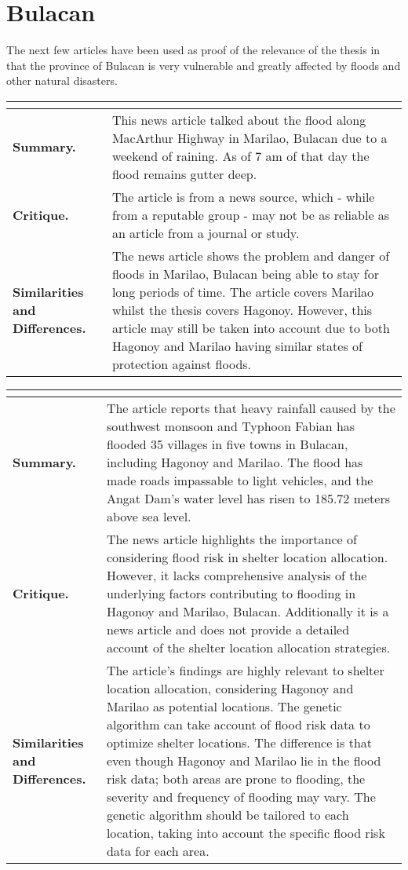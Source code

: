 \section{Bulacan}

The next few articles have been used as proof of the relevance of the thesis in that the province of Bulacan is very vulnerable and greatly affected by floods and other natural disasters.

\begin{longtable}{|L{.2\linewidth}|L{.74\linewidth}|}
	\hline
	\\ \hline
	\textbf{Summary.} & This news article talked about the flood along MacArthur Highway in Marilao, Bulacan due to a weekend of raining. As of 7 am of that day the flood remains gutter deep.\\ \hline
	\textbf{Critique.} & The article is from a news source, which - while from a reputable group - may not be as reliable as an article from a journal or study.\\ \hline
	\textbf{Similarities and Differences.} & The news article shows the problem and danger of floods in Marilao, Bulacan being able to stay for long periods of time. The article covers Marilao whilst the thesis covers Hagonoy. However, this article may still be taken into account due to both Hagonoy and Marilao having similar states of protection against floods. \\ \hline
\end{longtable}

\begin{longtable}{|L{.2\linewidth}|L{.74\linewidth}|}
	\hline
	\\ \hline
	\textbf{Summary.} & The article reports that heavy rainfall caused by the southwest monsoon and Typhoon Fabian has flooded 35 villages in five towns in Bulacan, including Hagonoy and Marilao. The flood has made roads impassable to light vehicles, and the Angat Dam’s water level has risen to 185.72 meters above sea level.\\ \hline
	\textbf{Critique.} & The news article highlights the importance of considering flood risk in shelter location allocation. However, it lacks comprehensive analysis of the underlying factors contributing to flooding in Hagonoy and Marilao, Bulacan. Additionally it is a news article and does not provide a detailed account of the shelter location allocation strategies.\\ \hline
	\textbf{Similarities and Differences.} & The article’s findings are highly relevant to shelter location allocation, considering Hagonoy and Marilao as potential locations. The genetic algorithm can take account of flood risk data to optimize shelter locations. The difference is that even though Hagonoy and Marilao lie in the flood risk data; both areas are prone to flooding, the severity and frequency of flooding may vary. The genetic algorithm should be tailored to each location, taking into account the specific flood risk data for each area.\\ \hline
\end{longtable}

